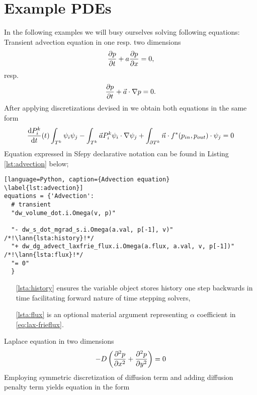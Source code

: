 \section{Example PDEs}
In the following examples we will busy ourselves solving following equations:\\
Transient advection equation in one resp. two dimensions
\begin{equation}
	\label{eq:ex_advection}
	\frac{\partial p}{\partial t} + a\frac{\partial p}{\partial x} = 0,
\end{equation}
resp.
\begin{equation}
	\frac{\partial p}{\partial t} + \vec{a}\cdot\nabla{p} = 0.
\end{equation}
After applying discretizations devised in  we obtain both equations in 
the same form
\begin{equation}
		 \frac{\text{d}P^k_i}{\text{d}t}(t)\int_{T^k}\psi_i\psi_j 
		 - \int_{T^k} \vec{a}P_i^k\psi_i\cdot\nabla\psi_j 
		 + \int_{\partial{T^k}} \vec{n}
		\cdot f^{*} (p_{in}, p_{out})\cdot\psi_j = 0
\end{equation}
Equation expressed in Sfepy declarative notation can be found in Listing 
\ref{lst:advection} below;
\setcounter{lstannotation}{0}
\begin{lstlisting}[language=Python, caption={Advection equation}
\label{lst:advection}]
equations = {'Advection': 
  # transient
  "dw_volume_dot.i.Omega(v, p)"
 
  "- dw_s_dot_mgrad_s.i.Omega(a.val, p[-1], v)" /*!\lann{lsta:history}!*/
  "+ dw_dg_advect_laxfrie_flux.i.Omega(a.flux, a.val, v, p[-1])"  /*!\lann{lsta:flux}!*/
  "= 0"
  }
\end{lstlisting}
\begin{itemize}
	\item[\ref{lsta:history}]  ensures the variable object stores 
	history one step backwards in time facilitating forward nature of time stepping 
	solvers,
	\item[\ref{lsta:flux}]  is an optional material argument 
	representing $\alpha$ coefficient in \eqref{eq:lax-frieflux}.
\end{itemize}
Laplace equation in two dimensions
\begin{equation}
	\label{eq:ex_laplace}
	- D \left(\frac{\partial^2 p}{\partial x^2} + \frac{\partial^2 p}{\partial y^2} \right)= 0
\end{equation}
Employing symmetric discretization of diffusion term and adding diffusion penalty term 
yields equation in the form
